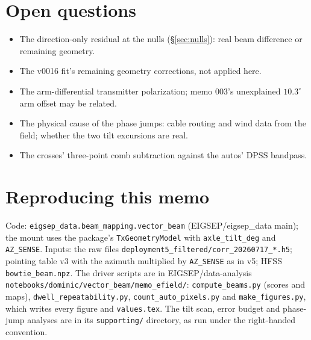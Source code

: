 \documentclass{aastex631}
\begin{document}
\section{Open questions} \label{sec:open}
\begin{itemize}
\item The direction-only residual at the nulls (\S\ref{sec:nulls}): real beam difference or remaining geometry.
\item The v0016 fit's remaining geometry corrections, not applied here.
\item The arm-differential transmitter polarization; memo 003's unexplained $10.3^\circ$ arm offset may be
  related.
\item The physical cause of the phase jumps: cable routing and wind data from the field; whether the two tilt
  excursions are real.
\item The crosses' three-point comb subtraction against the autos' DPSS bandpass.
\end{itemize}

\appendix
\section{Reproducing this memo} \label{app:repro}
Code: \texttt{eigsep\_data.beam\_mapping.vector\_beam} (EIGSEP/eigsep\_data main); the mount uses the
package's \texttt{TxGeometryModel} with \texttt{axle\_tilt\_deg} and \texttt{AZ\_SENSE}. Inputs: the raw files
\texttt{deployment5\_filtered/corr\_20260717\_*.h5}; pointing table v3 with the azimuth multiplied by
\texttt{AZ\_SENSE} as in v5; HFSS \texttt{bowtie\_beam.npz}. The driver scripts are in EIGSEP/data-analysis
\texttt{notebooks/dominic/vector\_beam/memo\_efield/}: \texttt{compute\_beams.py} (scores and maps),
\texttt{dwell\_repeatability.py}, \texttt{count\_auto\_pixels.py} and \texttt{make\_figures.py}, which writes
every figure and \texttt{values.tex}. The tilt scan, error budget and phase-jump analyses are in its
\texttt{supporting/} directory, as run under the right-handed convention.
\end{document}
